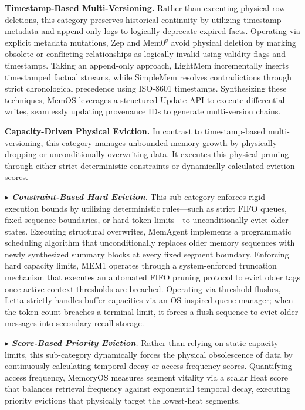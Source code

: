 \noindent {} \textbf{Timestamp-Based Multi-Versioning.}
Rather than executing physical row deletions, this category preserves historical continuity by utilizing timestamp metadata and append-only logs to logically deprecate expired facts.
Operating via explicit metadata mutations, Zep and $\text{Mem0}^g$ avoid physical deletion by marking obsolete or conflicting relationships as logically invalid using validity flags and timestamps.
Taking an append-only approach, LightMem incrementally inserts timestamped factual streams, while SimpleMem resolves contradictions through strict chronological precedence using ISO-8601 timestamps.
Synthesizing these techniques, MemOS leverages a structured Update API to execute differential writes, seamlessly updating provenance IDs to generate multi-version chains.

\noindent {} \textbf{Capacity-Driven Physical Eviction.}
In contrast to timestamp-based multi-versioning, this category manages unbounded memory growth by physically dropping or unconditionally overwriting data.
It executes this physical pruning through either strict deterministic constraints or dynamically calculated eviction scores.

\noindent \underline{\textit{$\blacktriangleright$ \textbf{Constraint-Based Hard Eviction}.}}
This sub-category enforces rigid execution bounds by utilizing deterministic rules—such as strict FIFO queues, fixed sequence boundaries, or hard token limits—to unconditionally evict older states.
Executing structural overwrites, MemAgent implements a programmatic scheduling algorithm that unconditionally replaces older memory sequences with newly synthesized summary blocks at every fixed segment boundary. Enforcing hard capacity limits, MEM1 operates through a system-enforced truncation mechanism that executes an automated FIFO pruning protocol to evict older tags once active context thresholds are breached. Operating via threshold flushes, Letta strictly handles buffer capacities via an OS-inspired queue manager; when the token count breaches a terminal limit, it forces a flush sequence to evict older messages into secondary recall storage.

\noindent \underline{\textit{$\blacktriangleright$ \textbf{Score-Based Priority Eviction}.}}
Rather than relying on static capacity limits, this sub-category dynamically forces the physical obsolescence of data by continuously calculating temporal decay or access-frequency scores.
Quantifying access frequency, MemoryOS measures segment vitality via a scalar Heat score that balances retrieval frequency against exponential temporal decay, executing priority evictions that physically target the lowest-heat segments.

